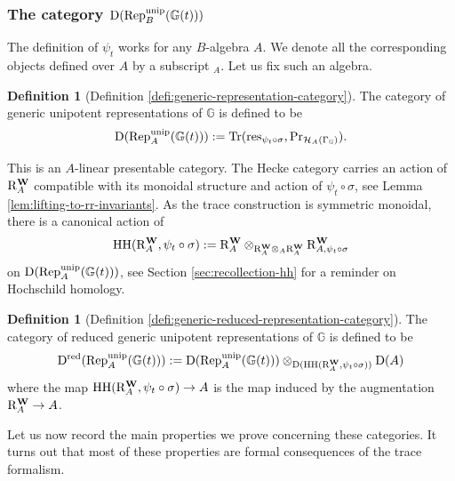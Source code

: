 \documentclass[a4paper, 10pt, oneside, reqno]{amsart}
\theoremstyle{plain}
\theoremstyle{definition}
\newtheorem{defi}[thm]{Definition}
\theoremstyle{remark}
\newcommand{\Gbb}{\mathbb{G}}
\newcommand{\RR}{\mathrm{R}}
\newcommand{\HHH}{\mathrm{HH}}
\newcommand{\Prr}{\mathrm{Pr}}
\newcommand{\restr}{\mathrm{res}}
\begin{document}
\subsubsection{The category $\DD(\Rep_B^{\unip}(\Gbb(t)))$}

The definition of $\psi_t$ works for any $B$-algebra $A$. We denote all the corresponding objects defined over $A$ by a subscript $_A$. Let us fix such an algebra. 
\begin{defi}[Definition \ref{defi:generic-representation-category}]
The category of generic unipotent representations of $\Gbb$ is defined to be 
$$\DD(\Rep_A^{\unip}(\Gbb(t))) := \Tr(\restr_{\psi_t \circ \sigma}, \Prr_{\Hcal_A(\Gamma_{\Gbb})}).$$
\end{defi}

This is an $A$-linear presentable category. The Hecke category carries an action of $\RR_A^{\Wbf}$ compatible with its monoidal structure and action of $\psi_t \circ \sigma$, see Lemma \ref{lem:lifting-to-rr-invariants}. As the trace construction is symmetric monoidal, there is a canonical action of 
$$\HHH(\RR_A^{\Wbf}, \psi_t \circ \sigma) := \RR_A^{\Wbf} \otimes_{\RR_A^{\Wbf} \otimes_A \RR_A^{\Wbf}} \RR_{A, \psi_t \circ \sigma}^{\Wbf}$$
on $\DD(\Rep_A^{\unip}(\Gbb(t)))$, see Section \ref{sec:recollection-hh} for a reminder on Hochschild homology. 

\begin{defi}[Definition \ref{defi:generic-reduced-representation-category}]
The category of reduced generic unipotent representations of $\Gbb$ is defined to be
$$\DD^{\red}(\Rep_A^{\unip}(\Gbb(t))) := \DD(\Rep_A^{\unip}(\Gbb(t))) \otimes_{\DD(\HHH(\RR_A^{\Wbf}, \psi_t \circ \sigma))} \DD(A)$$
where the map $\HHH(\RR_A^{\Wbf}, \psi_t \circ \sigma) \to A$ is the map induced by the augmentation $\RR_A^{\Wbf} \to A$. 
\end{defi}

Let us now record the main properties we prove concerning these categories. It turns out that most of these properties are formal consequences of the trace formalism. 
\end{document}
